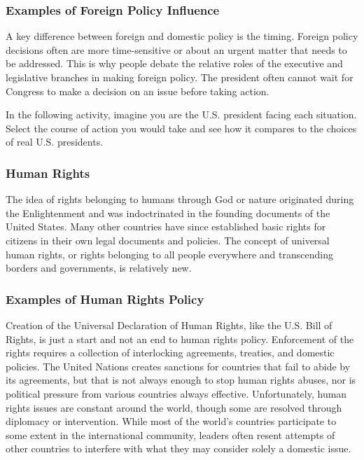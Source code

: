 \subsubsection{Examples of Foreign Policy Influence}


A key difference between foreign and domestic policy is the timing. Foreign
policy decisions often are more time-sensitive or about an urgent matter that
needs to be addressed. This is why people debate the relative roles of the
executive and legislative branches in making foreign policy. The president often
cannot wait for Congress to make a decision on an issue before taking action.

In the following activity, imagine you are the U.S. president facing each
situation. Select the course of action you would take and see how it compares to
the choices of real U.S. presidents.

\subsubsection{Human Rights}


The idea of rights belonging to humans through God or nature originated during
the Enlightenment and was indoctrinated in the founding documents of the United
States. Many other countries have since established basic rights for citizens in
their own legal documents and policies. The concept of universal human rights,
or rights belonging to all people everywhere and transcending borders and
governments, is relatively new.

\subsubsection{Examples of Human Rights Policy}

Creation of the Universal Declaration of Human Rights, like the U.S. Bill of
Rights, is just a start and not an end to human rights policy. Enforcement of
the rights requires a collection of interlocking agreements, treaties, and
domestic policies. The United Nations creates sanctions for countries that fail
to abide by its agreements, but that is not always enough to stop human rights
abuses, nor is political pressure from various countries always effective.
Unfortunately, human rights issues are constant around the world, though some
are resolved through diplomacy or intervention. While most of the world's
countries participate to some extent in the international community, leaders
often resent attempts of other countries to interfere with what they may
consider solely a domestic issue.

\newpage
